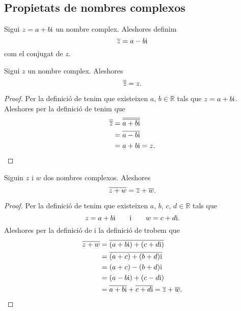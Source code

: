 \documentclass[../../Main.tex]{subfiles}
\begin{document}
	\subsection{Propietats de nombres complexos}
	\begin{definition}
		\label{def:conjugat d'un nombre complex}
		Sigui \(z=a+b\mathrm{i}\) un nombre complex. Aleshores definim
		\[\overline{z}=a-b\mathrm{i}\]
		com el conjugat de \(z\).
	\end{definition}
	\begin{proposition}
		\label{prop:el conjugat del conjugat d'un nombre complex és ell mateix}
		Sigui \(z\) un nombre complex. Aleshores
		\[\overline{\overline{z}}=z.\]
		\begin{proof}
			Per la definició de  tenim que existeixen \(a\), \(b\in\mathbb{R}\) tals que \(z=a+b\mathrm{i}\). Aleshores per la definició de  tenim que
			\begin{align*}
				\overline{\overline{z}}&=\overline{\overline{a+b\mathrm{i}}} \\
				&=\overline{a-b\mathrm{i}} \\
				&=a+b\mathrm{i}=z.\qedhere
			\end{align*}
		\end{proof}
	\end{proposition}
	\begin{proposition}
		\label{prop:el conjugat de la suma és la suma de conjugats}
		Siguin \(z\) i \(w\) dos nombres complexos. Aleshores
		\[\overline{z+w}=\overline{z}+\overline{w}.\]
		\begin{proof}
			Per la definició de  tenim que existeixen \(a\), \(b\), \(c\), \(d\in\mathbb{R}\) tals que
			\[z=a+b\mathrm{i}\qquad\text{i}\qquad w=c+d\mathrm{i}.\]
			Aleshores per la definició de  i la definició de  trobem que
			\begin{align*}
				\overline{z+w}&=\overline{(a+b\mathrm{i})+(c+d\mathrm{i})} \\
				&=\overline{(a+c)+(b+d)\mathrm{i}} \\
				&=(a+c)-(b+d)\mathrm{i} \\
				&=(a-b\mathrm{i})+(c-d\mathrm{i}) \\
				&=\overline{a+b\mathrm{i}}+\overline{c+d\mathrm{i}}=\overline{z}+\overline{w}.\qedhere
			\end{align*}
		\end{proof}
	\end{proposition}
\end{document}
